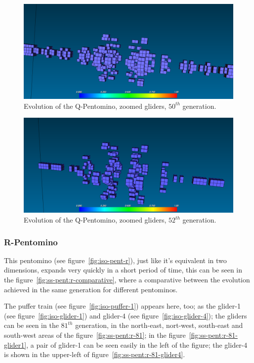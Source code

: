 \begin{figure}
	\centering
	\includegraphics[scale=0.3]{pentominoes_ss/q_50_gliders.png}
	\caption{Evolution of the Q-Pentomino, zoomed gliders, $50^{th}$ generation.}
  \label{fig:ss-pent:q-50-gliders}
\end{figure}

\begin{figure}
	\centering
	\includegraphics[scale=0.3]{pentominoes_ss/q_52_gliders.png}
	\caption{Evolution of the Q-Pentomino, zoomed gliders, $52^{th}$ generation.}
  \label{fig:ss-pent:q-52-gliders}
\end{figure}

\subsubsection{R-Pentomino}
\label{sec:r-pentomino}
This pentomino (see figure~\ref{fig:iso-pent-r}), just like it's equivalent in
two dimensions, expands very quickly in a short period of time, this can be seen
in the figure~\ref{fig:ss-pent:r-comparative}, where a comparative between the
evolution achieved in the same generation for different pentominos.

The puffer train (see figure~\ref{fig:iso-puffer-1}) appears here, too; as the
glider-1 (see figure~\ref{fig:iso-glider-1}) and glider-4 (see
figure~\ref{fig:iso-glider-4}); the gliders can be seen in the  $81^{th}$
generation, in the north-east, nort-west, south-east and south-west areas of the
figure~\ref{fig:ss-pent:r-81}; in the figure~\ref{fig:ss-pent:r-81-glider1}, a
pair of glider-1 can be seen easily in the left of the figure; the glider-4 is
shown in the upper-left of figure~\ref{fig:ss-pent:r-81-glider4}.

